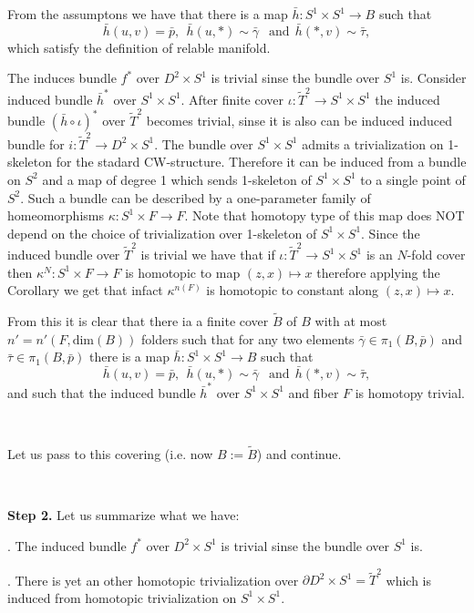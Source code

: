\documentclass{article}
\def\noi{\noindent}%
\begin{document}
From the assumptons we have 
that there is a map 
$\bar h:S^1\times S^1\to B$ such that 
$$\bar h(u,v)=\bar p,\ \ 
\bar h(u,*)\sim\bar\gamma\ \ \text{ and}\ \ 
\bar h(*,v)\sim\bar\tau,$$
which satisfy the definition of relable manifold.

The  induces bundle $f^*$ over $D^2\times S^1$ 
is trivial sinse the bundle over $S^1$ is. 
Consider induced bundle $\bar h^*$ over $S^1\times S^1$. 
After finite cover $\iota:\tilde T^2\to S^1\times S^1$ the induced bundle 
$(\bar h \circ \iota)^*$ over $\tilde T^2$ becomes trivial, sinse it is also can be induced induced bundle for $i:\tilde T^2\to D^2\times S^1$.
The bundle over $S^1\times S^1$ admits a trivialization on 1-skeleton 
for the stadard CW-structure. 
Therefore it can be induced from a bundle on $S^2$ and a map of degree 1 
which sends 1-skeleton of $S^1\times S^1$ to a single point of $S^2$. 
Such a bundle can be described by a one-parameter family of homeomorphisms 
$\kappa:S^1\times F\to F$. 
Note that homotopy type of this map does NOT depend on the choice of 
trivialization over 1-skeleton of $S^1\times S^1$.
Since the induced bundle over $\tilde T^2$ is trivial we have that 
if $ \iota: \tilde T^2\to S^1\times S^1$ is an $N$-fold cover then 
$\kappa^N:S^1\times F\to F$ is homotopic to map $(z,x)\mapsto x$
therefore applying the Corollary we get that infact $\kappa^{n(F)}$ 
is homotopic to constant along $(z,x)\mapsto x$.

From this it is clear that there ia a finite cover $\widetilde B$ of $B$ with at most $n'=n'(F,\text{dim}(B))$ folders such that for any two elements $\bar\gamma\in \pi_1(B,\bar p)$ and $\bar\tau\in \pi_1(B,\bar p)$ there is a map 
$\bar h:S^1\times S^1\to B$ such that 
$$\bar h(u,v)=\bar p,\ \ 
\bar h(u,*)\sim\bar\gamma\ \ \text{ and}\ \ 
\bar h(*,v)\sim\bar\tau,$$
and such that the induced bundle $\bar h^*$ over $S^1\times S^1$ and fiber $F$ is homotopy trivial.

\ 

Let us pass to this covering (i.e. now $B:=\widetilde B$) and continue.

\ 

{\bf Step 2.} Let us summarize what we have:

\noi
1. The  induced bundle $f^*$ over $D^2\times S^1$ is trivial sinse the bundle over $S^1$ is. 

\noi
2. There is yet an other homotopic trivialization over $\partial D^2\times S^1=\widetilde T^2$ which is induced from homotopic trivialization on $S^1\times S^1$.
\end{document}

